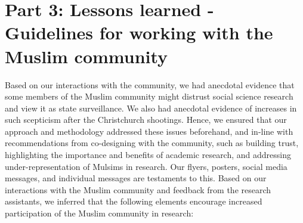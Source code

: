 \documentclass[
]{interact}
\begin{document}
\section{Part 3: Lessons learned - Guidelines for working with the
Muslim
community}\label{part-3-lessons-learned---guidelines-for-working-with-the-muslim-community}

Based on our interactions with the community, we had anecdotal evidence
that some members of the Muslim community might distrust social science
research and view it as state surveillance. We also had anecdotal
evidence of increases in such scepticism after the Christchurch
shootings. Hence, we ensured that our approach and methodology addressed
these issues beforehand, and in-line with recommendations from
co-designing with the community, such as building trust, highlighting
the importance and benefits of academic research, and addressing
under-representation of Mulsims in research. Our flyers, posters, social
media messages, and individual messages are testaments to this. Based on
our interactions with the Muslim community and feedback from the
research assistants, we inferred that the following elements encourage
increased participation of the Muslim community in research:
\end{document}
